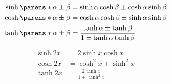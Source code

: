 \begin{multicols}{2}
\begin{CheatsheetEntryFrame}
        \begin{align*}
            \sinh{\parens*{\alpha \pm \beta}} &= \sinh{\alpha} \cosh{\beta } \pm \cosh{\alpha} \sinh{\beta } \\
            \cosh{\parens*{\alpha \pm \beta}} &= \cosh{\alpha} \cosh{\beta } \pm \sinh{\alpha} \sinh{\beta } \\
            \tanh{\parens*{\alpha \pm \beta}} &= \frac{\tanh{\alpha} \pm \tanh{\beta}}{1 \pm \tanh{\alpha} \tanh{\beta}}
        \end{align*}

        \begin{align*}
            \sinh{2x} &= 2 \sinh{x} \cosh{x} \\
            \cosh{2x} &= \cosh^2{x} + \sinh^2{x} \\
            \tanh{2x} &= \frac{2 \tanh{x}}{1 + \tanh^2{x}}
        \end{align*}

    \end{CheatsheetEntryFrame}

\end{multicols}

